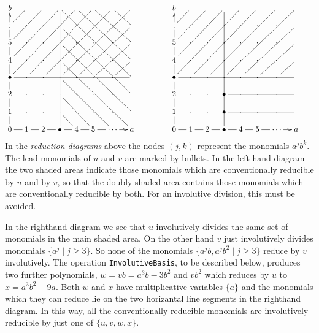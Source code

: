 \documentclass[a4paper,11pt]{report}
\begin{document}
{{\[ \vcenter{\xymatrix@=1em{ b & & & \ar@{-}[ddddrrrr] & \ar@{-}[dddrrr] &
\ar@{-}[ddrr] & \ar@{-}[dr] & & & & b & & & & & & & \\ : \ar[u] \ar@{-}[ur] &
\cdot & \cdot & \cdot \ar@{-}[ddddrrrr] & \cdot & \cdot & \cdot & & & & :
\ar[u] \ar@{-}[ur] & \cdot & \cdot & \cdot & \cdot & \cdot & \cdot & \\ 5
\ar@{-}[u] \ar@{-}[uurr] & \cdot & \cdot & \cdot \ar@{-}[ddddrrrr] & \cdot &
\cdot & \cdot & & & & 5 \ar@{-}[u] \ar@{-}[uurr] & \cdot & \cdot & \cdot &
\cdot & \cdot & \cdot & \\ 4 \ar@{-}[u] \ar@{-}[uuurrr] & \cdot & \cdot &
\cdot \ar@{-}[ddddrrrr] & \cdot & \cdot & \cdot & & & & 4 \ar@{-}[u]
\ar@{-}[uuurrr] & \cdot & \cdot & \cdot & \cdot & \cdot & \cdot & \\ \bullet
\ar@{-}[u] \ar@{-}[rrrrrrr] \ar@{-}[uuuurrrr] & \cdot \ar@{-}[uuuurrrr] &
\cdot \ar@{-}[uuuurrrr] & \cdot \ar@{-}[dddrrr] \ar@{-}[uuuurrrr] & \cdot
\ar@{-}[uuurrr] & \cdot \ar@{-}[uurr] & \cdot \ar@{-}[ur] & & & & \bullet
\ar@{-}[u] \ar@{-}[rrrrrrr] \ar@{-}[uuuurrrr] & \cdot \ar@{-}[uuuurrrr] &
\cdot \ar@{-}[uuuurrrr] & \cdot \ar@{-}[uuuurrrr] & \cdot \ar@{-}[uuurrr] &
\cdot \ar@{-}[uurr] & \cdot \ar@{-}[ur] & & \\ 2 \ar@{-}[u] & \cdot & \cdot &
\cdot \ar@{-}[ddrr] & \cdot & \cdot & \cdot & & & & 2 \ar@{-}[u] & \cdot &
\cdot & \bullet \ar@{-}[rrrr]& \cdot & \cdot & \cdot & \\ 1 \ar@{-}[u] & \cdot
& \cdot & \cdot \ar@{-}[dr] & \cdot & \cdot & \cdot & & & & 1 \ar@{-}[u] &
\cdot & \cdot & \bullet \ar@{-}[rrrr] & \cdot & \cdot & \cdot & \\ 0
\ar@{-}[r]\ar@{-}[u] & 1 \ar@{-}[r] & 2 \ar@{-}[r] & \bullet \ar@{-}[r]
\ar@{-}[uuuuuuu] & 4 \ar@{-}[r] & 5 \ar@{-}[r] & \cdots \ar[r] & a & & & 0
\ar@{-}[r]\ar@{-}[u] & 1 \ar@{-}[r] & 2 \ar@{-}[r] & \bullet \ar@{-}[r]
\ar@{-}[uuuuuuu] & 4 \ar@{-}[r] & 5 \ar@{-}[r] & \cdots \ar[r] & a }} \]
 In the \emph{reduction diagrams} above the nodes $(j,k)$ represent the monomials $a^jb^k$. The lead monomials of $u$ and $v$ are marked by bullets. In the left hand diagram the two shaded areas indicate
those monomials which are conventionally reducible by $u$ and by $v$, so that the doubly shaded area contains those monomials which are
conventionally reducible by both. For an involutive division, this must be
avoided. 

 In the right\texttt{}hand diagram we see that $u$ involutively divides the same set of monomials in the main shaded area. On the
other hand $v$ just involutively divides monomials $\{a^j \mid j \ge 3\}$. So none of the monomials $\{a^jb, a^jb^2 \mid j \ge 3\}$ reduce by $v$ involutively. The operation \texttt{InvolutiveBasis}, to be described below, produces two further polynomials, $w = vb = a^3b-3b^2$ and $vb^2$ which reduces by $u$ to $x = a^3b^2 - 9a$. Both $w$ and $x$ have multiplicative variables $\{a\}$ and the monomials which they can reduce lie on the two horizantal line
segments in the right\texttt{}hand diagram. In this way, all the
conventionally reducible monomials are involutively reducible by just one of $\{u,v,w,x\}$. 

}}
\end{document}
